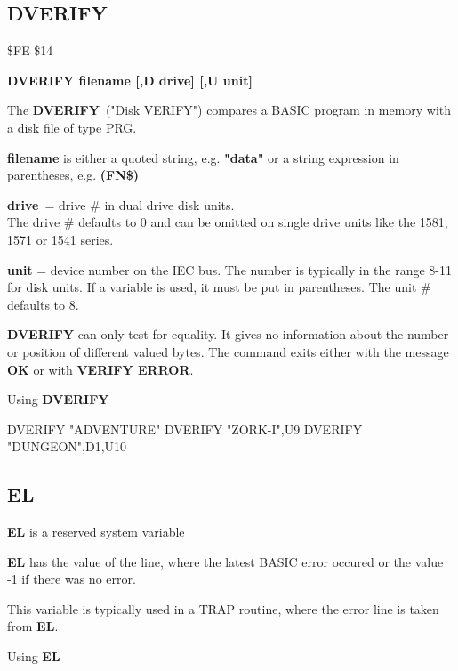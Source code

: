 
\newpage
\subsection{DVERIFY}
\begin{description}[leftmargin=3cm,style=nextline]
\item [Token:] \$FE \$14
\item [Format:] {\bf DVERIFY filename [,D drive] [,U unit] }
\item [Usage:]
   The {\bf DVERIFY} ("Disk VERIFY") compares a BASIC program
   in memory with a disk file of type PRG.

   {\bf filename} is either a quoted string, e.g. {\bf "data"} or
   a string expression in parentheses, e.g. {\bf (FN\$)}

   {\bf drive} = drive \# in dual drive disk units. \\
   The drive \# defaults to 0 and can be omitted on single drive units
   like the 1581, 1571 or 1541 series.

   {\bf unit} = device number on the IEC bus.
   The number is typically in the range 8-11 for disk units.
   If a variable is used, it must be put in parentheses.
   The unit \# defaults to 8.

\item [Remarks:]
   {\bf DVERIFY} can only test for equality. It gives no information
   about the number or position of different valued bytes.
   The command exits either with the message {\bf OK}
   or with {\bf VERIFY ERROR}.

\item [Example:] Using {\bf DVERIFY}
\begin{screenoutput}
  DVERIFY "ADVENTURE"
  DVERIFY "ZORK-I",U9
  DVERIFY "DUNGEON",D1,U10
\end{screenoutput}
\end{description}


\newpage
\subsection{EL}
\begin{description}[leftmargin=3cm,style=nextline]
\item [Format:] {\bf EL} is a reserved system variable
\item [Usage:]  {\bf EL} has the value of the line, where
               the latest BASIC error
               occured or the value -1 if there was no error.

This variable is typically used in a TRAP routine,
where the error line is taken from {\bf EL}.

\item [Example:] Using {\bf EL}
\end{description}

